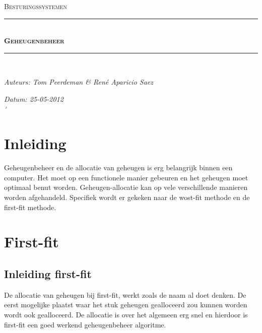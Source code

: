 \documentclass[11pt]{article}
\newcommand{\HRule}{\rule{\linewidth}{0.5mm}}
\begin{document}
	\begin{titlepage}
	\begin{center}
		\textsc{\Large Besturingssystemen}\\[0.5cm]
		\HRule \\[0,4cm]
		\textsc{\huge \bfseries Geheugenbeheer}
		\HRule \\[8cm]
		\begin{minipage}{0.4\textwidth}
			\begin{flushleft}\large
				\emph{Auteurs: Tom Peerdeman \& Ren\'e Aparicio Saez}\\
			\end{flushleft}
		\end{minipage}
		\begin{minipage}{0.4\textwidth}
			\begin{flushright}\large
			\emph{Datum: 25-05-2012\\\'}\\
			\end{flushright}
		\end{minipage}
	\end{center}
	\end{titlepage}

	\tableofcontents
	\newpage

	\section{Inleiding}\label{sec:inleiding}
	Geheugenbeheer en de allocatie van geheugen is erg belangrijk binnen een computer. Het moet op een functionele manier gebeuren en het geheugen moet optimaal benut worden. Geheugen-allocatie kan op vele verschillende manieren worden afgehandeld. Specifiek wordt er gekeken naar de wost-fit methode en de first-fit methode.
	\newpage


	\section{First-fit}\label{sec:first-fit}
	\subsection{Inleiding first-fit}\label{sec:inleidingff}
	De allocatie van geheugen bij first-fit, werkt zoals de naam al doet denken. De eerst mogelijke plaatst waar het stuk geheugen gealloceerd zou kunnen worden wordt ook gealloceerd. De allocatie is over het algemeen erg snel en hierdoor is first-fit een goed werkend geheugenbeheer algoritme.
\end{document}
